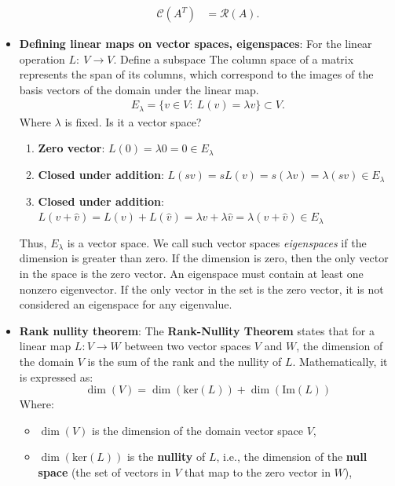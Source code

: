 \documentclass{report}
\begin{document}
\begin{itemize}
\begin{align*}
                \mathcal{C}(A^{T})&=\mathcal{R}(A)
            .\end{align*}
        \item \textbf{Defining linear maps on vector spaces, eigenspaces}: For the linear operation $L:\  V \to V$. Define a subspace 
            The column space of a matrix represents the span of its columns, which correspond to the images of the basis vectors of the domain under the linear map.
            \begin{align*}
                E_{\lambda} = \{v \in V :\ L(v) = \lambda v\} \subset V
            .\end{align*}
            Where $\lambda$ is fixed. Is it a vector space?
            \begin{enumerate}
                \item \textbf{Zero vector}: $L(0) = \lambda 0 = 0 \in E_{\lambda} $
                \item \textbf{Closed under addition}: $L(sv) = sL(v) = s(\lambda v ) = \lambda (sv) \in E_{\lambda}$
                \item \textbf{Closed under addition}: $L(v + \hat{v}) = L(v) + L(\hat{v}) = \lambda v + \lambda\hat{v} = \lambda(v + \hat{v}) \in E_{\lambda}$
            \end{enumerate}
            \bigbreak \noindent 
            Thus, $E_{\lambda}$ is a vector space. We call such vector spaces \textit{eigenspaces} if the dimension is greater than zero. If the dimension is zero, then the only vector in the space is the zero vector. An eigenspace must contain at least one nonzero eigenvector. If the only vector in the set is the zero vector, it is not considered an eigenspace for any eigenvalue.
        \item \textbf{Rank nullity theorem}: 
            The \textbf{Rank-Nullity Theorem} states that for a linear map \( L: V \to W \) between two vector spaces \( V \) and \( W \), the dimension of the domain \( V \) is the sum of the rank and the nullity of \( L \). Mathematically, it is expressed as:
            \[
                \dim(V) = \dim(\text{ker}(L)) + \dim(\text{Im}(L))
            \]
            Where:
            \begin{itemize}
                \item \( \dim(V) \) is the dimension of the domain vector space \( V \),
                \item \( \dim(\text{ker}(L)) \) is the \textbf{nullity} of \( L \), i.e., the dimension of the \textbf{null space} (the set of vectors in \( V \) that map to the zero vector in \( W \)),

\end{itemize}
\end{itemize}
\end{document}
